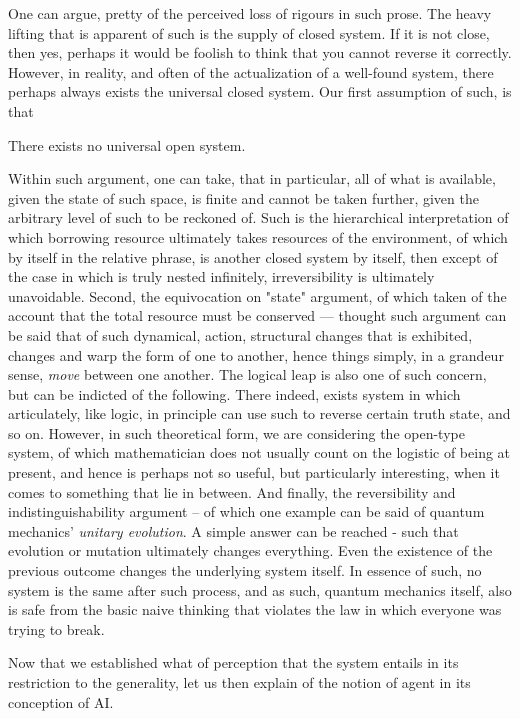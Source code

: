 One can argue, pretty of the perceived loss of rigours in such prose. The heavy lifting that is apparent of such is the supply of closed system. If it is not close, then yes, perhaps it would be foolish to think that you cannot reverse it correctly. However, in reality, and often of the actualization of a well-found system, there perhaps always exists the universal closed system. Our first assumption of such, is that 

\begin{assumption}
    There exists no universal open system. 
\end{assumption}
Within such argument, one can take, that in particular, all of what is available, given the state of such space, is finite and cannot be taken further, given the arbitrary level of such to be reckoned of. Such is the hierarchical interpretation of which borrowing resource ultimately takes resources of the environment, of which by itself in the relative phrase, is another closed system by itself, then except of the case in which is truly nested infinitely, irreversibility is ultimately unavoidable. Second, the equivocation on "state" argument, of which taken of the account that the total resource must be conserved --- thought such argument can be said that of such dynamical, action, structural changes that is exhibited, changes and warp the form of one to another, hence things simply, in a grandeur sense, \textit{move} between one another. The logical leap is also one of such concern, but can be indicted of the following. There indeed, exists system in which articulately, like logic, in principle can use such to reverse certain truth state, and so on. However, in such theoretical form, we are considering the open-type system, of which mathematician does not usually count on the logistic of being at present, and hence is perhaps not so useful, but particularly interesting, when it comes to something that lie in between. And finally, the reversibility and indistinguishability argument -- of which one example can be said of quantum mechanics' \textit{unitary evolution}. A simple answer can be reached - such that evolution or mutation ultimately changes everything. Even the existence of the previous outcome changes the underlying system itself. In essence of such, no system is the same after such process, and as such, quantum mechanics itself, also is safe from the basic naive thinking that violates the law in which everyone was trying to break. 

Now that we established what of perception that the system entails in its restriction to the generality, let us then explain of the notion of agent in its conception of AI. 

